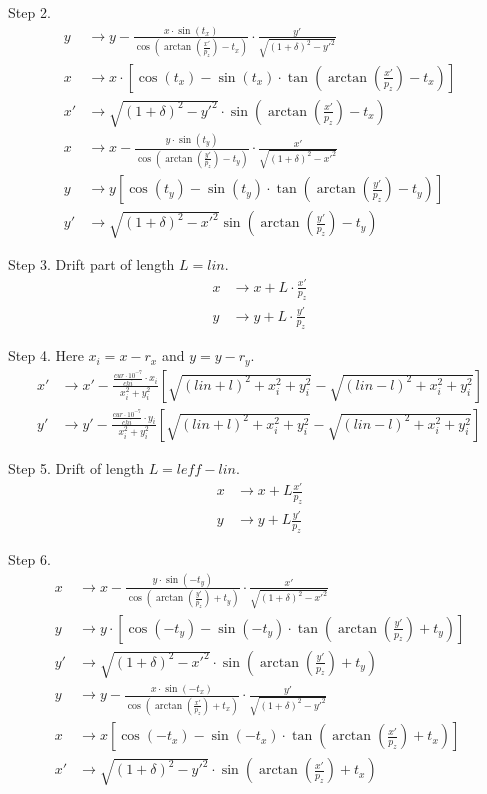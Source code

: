 \documentclass[english]{article}
\begin{document}
Step 2.
\begin{align*}
	y &\to y - \frac{x\cdot\sin(t_x)}{
    \cos\left(\arctan\left(\frac{x'}{p_z}\right)-t_x\right)}\cdot
    \frac{y'}{\sqrt{(1+\delta)^2-y'^2}} \\
    x &\to x\cdot\left[\cos(t_x)-\sin(t_x)\cdot\tan\left(
    \arctan\left(\frac{x'}{p_z}\right)-t_x\right)\right] \\
    x' &\to \sqrt{(1+\delta)^2-y'^2}\cdot\sin\left(
    \arctan\left(\frac{x'}{p_z}\right)-t_x\right) \\
    x &\to x- \frac{y\cdot\sin(t_y)}{\cos\left(\arctan\left(\frac{y'}{p_z}\right)
    -t_y\right)} \cdot\frac{x'}{\sqrt{(1+\delta)^2-x'^2}} \\
    y &\to y \left[ \cos(t_y) - \sin(t_y)\cdot\tan\left(
    \arctan\left(\frac{y'}{p_z}\right)-t_y\right) \right] \\
    y' &\to \sqrt{(1+\delta)^2-x'^2}\sin\left(\arctan\left(
    \frac{y'}{p_z}\right)-t_y\right)
\end{align*}

Step 3. Drift part of length $L=lin$.
\begin{align*}
    x &\to x + L \cdot \frac{x'}{p_z} \\
    y &\to y + L \cdot \frac{y'}{p_z}
\end{align*}

Step 4. Here $x_i=x-r_x$ and $y=y-r_y$.
\begin{align*}
    x' &\to x' - \frac{\frac{cur\cdot10^{-7}}{chi}\cdot x_i}{x_i^2+y_i^2}
    \left[\sqrt{(lin+l)^2+x_i^2+y_i^2}-\sqrt{(lin-l)^2+x_i^2+y_i^2} \right] \\
    y' &\to y' - \frac{\frac{cur\cdot10^{-7}}{chi}\cdot y_i}{x_i^2+y_i^2}
    \left[\sqrt{(lin+l)^2+x_i^2+y_i^2}-\sqrt{(lin-l)^2+x_i^2+y_i^2} \right]
\end{align*}

Step 5. Drift of length $L=leff-lin$.
\begin{align*}
    x &\to x + L \frac{x'}{p_z} \\
    y &\to y + L \frac{y'}{p_z}
\end{align*}

Step 6.
\begin{align*}
	x &\to x - \frac{y\cdot\sin(-t_y)}{
    \cos\left(\arctan\left(\frac{y'}{p_z}\right)+t_y\right)}\cdot
    \frac{x'}{\sqrt{(1+\delta)^2-x'^2}} \\
    y &\to y\cdot\left[\cos(-t_y)-\sin(-t_y)\cdot\tan\left(
    \arctan\left(\frac{y'}{p_z}\right)+t_y\right)\right] \\
    y' &\to \sqrt{(1+\delta)^2-x'^2}\cdot\sin\left(
    \arctan\left(\frac{y'}{p_z}\right)+t_y\right) \\
    y &\to y- \frac{x\cdot\sin(-t_x)}{\cos\left(\arctan\left(\frac{x'}{p_z}\right)
    +t_x\right)} \cdot\frac{y'}{\sqrt{(1+\delta)^2-y'^2}} \\
    x &\to x \left[ \cos(-t_x) - \sin(-t_x)\cdot\tan\left(
    \arctan\left(\frac{x'}{p_z}\right)+t_x\right) \right] \\
    x' &\to \sqrt{(1+\delta)^2-y'^2}\cdot\sin\left(\arctan\left(
    \frac{x'}{p_z}\right)+t_x\right)
\end{align*}
\end{document}
